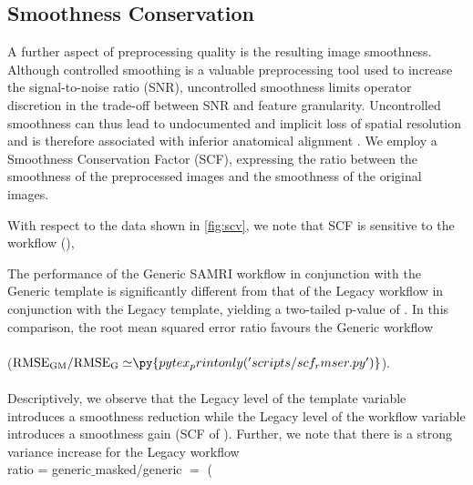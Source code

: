 \subsection{Smoothness Conservation}

A further aspect of preprocessing quality is the resulting image smoothness.
Although controlled smoothing is a valuable preprocessing tool used to increase the signal-to-noise ratio (SNR), uncontrolled smoothness limits operator discretion in the trade-off between SNR and feature granularity.
Uncontrolled smoothness can thus lead to undocumented and implicit loss of spatial resolution and is therefore associated with inferior anatomical alignment \cite{fmriprep}.
We employ a Smoothness Conservation Factor (SCF), expressing the ratio between the smoothness of the preprocessed images and the smoothness of the original images.

With respect to the data shown in \cref{fig:scv}, we note that SCF is sensitive to
the workflow (),

The performance of the Generic SAMRI workflow in conjunction with the Generic template is significantly different from that of the Legacy workflow in conjunction with the Legacy template, yielding a two-tailed p-value of .
In this comparison, the root mean squared error ratio favours the Generic workflow
\\
\\
($\mathrm{RMSE_{GM}/RMSE_{G}\simeq} \py{pytex_printonly('scripts/scf_rmser.py')}$).
\\
\\

Descriptively, we observe that the Legacy level of the template variable introduces a smoothness reduction
while the Legacy level of the workflow variable introduces a smoothness gain
(SCF of ).
Further, we note that there is a strong variance increase for the Legacy workflow
\\
ratio = generic$\_$masked/generic $=$ (
\\

